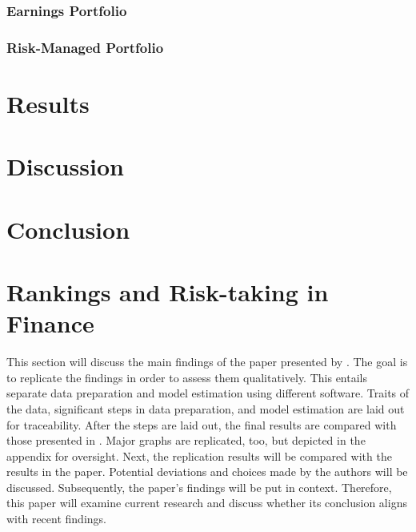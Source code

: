 \documentclass[12pt]{article}
\begin{document}
\subsubsection{Earnings Portfolio} \label{subsubsection:EP}

\subsubsection{Risk-Managed Portfolio} \label{subsubsection:rmport}


\section{Results} \label{section:Results}

\section{Discussion} \label{section:Discussion}

\section{Conclusion} \label{section:Conclusion}




\section{Rankings and Risk-taking in Finance} \label{section:rankings}
This section will discuss the main findings of the paper presented by \textcite{Kirchler2018}. The goal is to replicate the findings in order to assess them qualitatively. This entails separate data preparation and model estimation using different software.
Traits of the data, significant steps in data preparation, and model estimation are laid out for traceability. After the steps are laid out, the final results are compared with those presented in \textcite{Kirchler2018}. Major graphs are replicated, too, but depicted in the appendix for oversight.
Next, the replication results will be compared with the results in the paper. Potential deviations and choices made by the authors will be discussed. Subsequently, the paper's findings will be put in context. Therefore, this paper will examine current research and discuss whether its conclusion aligns with recent findings.
\end{document}
